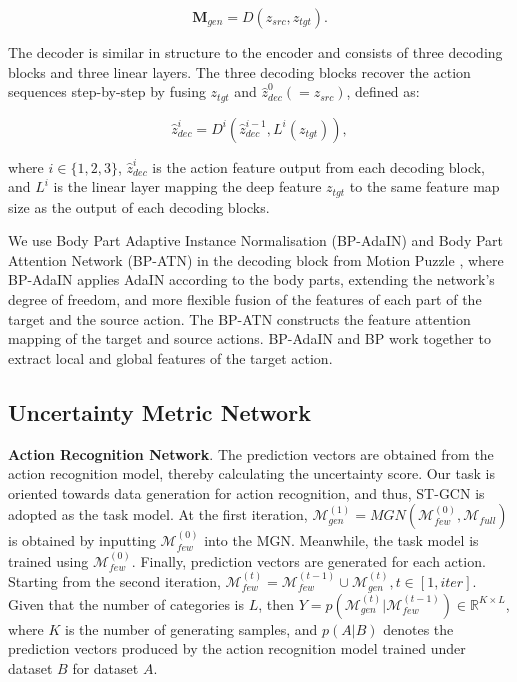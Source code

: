 \begin{equation}\label{e5}
\textbf{M}_{gen}=D(z_{src}, z_{tgt}).
\end{equation}

\noindent The decoder is similar in structure to the encoder and consists of three decoding blocks and three linear layers. 
The three decoding blocks recover the action sequences step-by-step by fusing $z_{tgt}$ and $\hat{z}^0_{dec}(=z_{src})$, defined as:

\begin{equation}\label{e6}
\hat{z}^i_{dec}=D^i(\hat{z}^{i-1}_{dec}, L^i(z_{tgt})),
\end{equation}

\noindent where $i\in \{1,2,3\}$, $\hat{z}_{dec}^i$ is the action feature output from each decoding block, and $L^i$ is the linear layer mapping the deep feature $z_{tgt}$ to the same feature map size as the output of each decoding blocks.

We use Body Part Adaptive Instance Normalisation (BP-AdaIN) and Body Part Attention Network (BP-ATN) in the decoding block from Motion Puzzle \cite{jang2022motion}, where BP-AdaIN applies AdaIN \cite{gatys2016image, saito2020coco} according to the body parts, extending the network's degree of freedom, and more flexible fusion of the features of each part of the target and the source action. 
The BP-ATN constructs the feature attention mapping of the target and source actions. 
BP-AdaIN and BP work together to extract local and global features of the target action.

\subsection{Uncertainty Metric Network}

\textbf{Action Recognition Network}. 
The prediction vectors are obtained from the action recognition model, thereby calculating the uncertainty score. 
Our task is oriented towards data generation for action recognition, and thus, ST-GCN is adopted as the task model. 
At the first iteration, $\mathcal{M}^{(1)}_{gen}=MGN(\mathcal{M}^{(0)}_{few},\mathcal{M}_{full})$ is obtained by inputting $\mathcal{M}^{(0)}_{few}$ into the MGN. 
Meanwhile, the task model is trained using $\mathcal{M}^{(0)}_{few}$. Finally, prediction vectors are generated for each action. 
Starting from the second iteration, $\mathcal{M}^{(t)}_{few}=\mathcal{M}^{(t-1)}_{few}\cup\mathcal{M}^{(t)}_{gen}, t\in[1,iter]$. 
Given that the number of categories is $L$, then $Y = p(\mathcal{M}^{(t)}_{gen}|\mathcal{M}^{(t-1)}_{few})\in\mathbb{R}^{K\times L}$,  where $K$ is the number of generating samples, and $p(A|B)$ denotes the prediction vectors produced by the action recognition model trained under dataset $B$ for dataset $A$.

